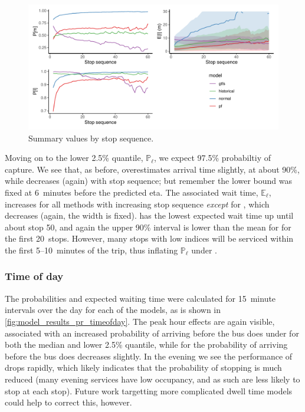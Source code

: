 \begin{knitrout}\small
{}\color{fgcolor}\begin{figure}
\includegraphics[width=\textwidth]{figure/model_results_pr_stop-1} \caption[Summary values by stop sequence]{Summary values by stop sequence.}\label{fig:model_results_pr_stop}
\end{figure}


\end{knitrout}


Moving on to the lower 2.5\% quantile, $\mathbb{P}_\ell$, we expect 97.5\% probabiltiy of capture. We see that, as before, \Fpf{} overestimates arrival time slightly, at about 90\%, while \Fsched{} decreases (again) with stop sequence; but remember the lower bound was fixed at 6~minutes before the predicted \gls{eta}. The associated wait time, $\mathbb{E}_\ell$, increases for all methods with increasing stop sequence \emph{except} for \Fsched{}, which decreases (again, the width is fixed). \Fpf{} has the lowest expected wait time up until about stop 50, and again the upper 90\% interval is lower than the mean for \Fsched{} for the first 20~stops. However, many stops with low indices will be serviced within the first 5--10~minutes of the trip, thus inflating $\mathbb{P}_\ell$ under \Fsched{}.



\subsubsection{Time of day}

The probabilities and expected waiting time were calculated for 15~minute intervals over the day for each of the models, as is shown in \cref{fig:model_results_pr_timeofday}. The peak hour effects are again visible, associated with an increased probability of arriving before the bus does under \Fpf{} for both the median and lower 2.5\% quantile, while for \Fsched{} the probability of arriving before the bus does decreases slightly. In the evening we see the performance of \Fpf{} drops rapidly, which likely indicates that the probability of stopping is much reduced (many evening services have low occupancy, and as such are less likely to stop at each stop). Future work targetting more complicated dwell time models could help to correct this, however.


